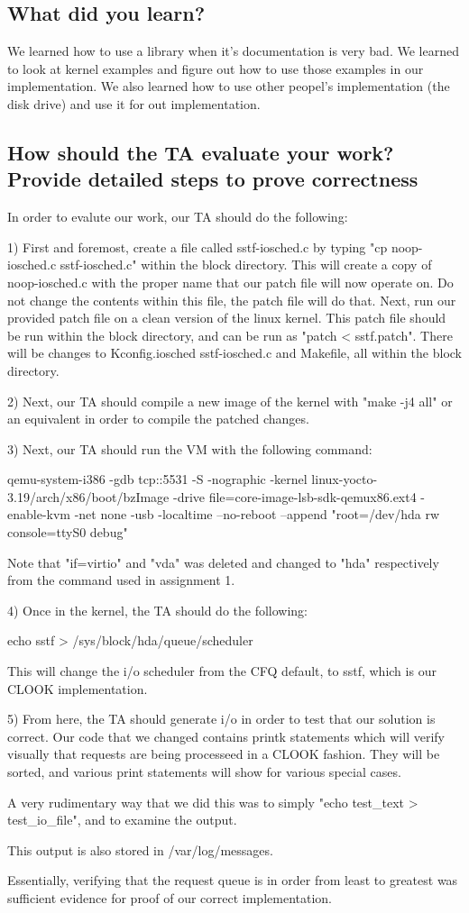 \documentclass{article}
\begin{document}
\subsection{What did you learn?}
We learned how to use a library when it's documentation is very bad. We learned to look at kernel examples and figure out how to use those examples in our implementation. We also learned how to use other peopel's implementation (the disk drive) and use it for out implementation. 

\subsection{How should the TA evaluate your work? Provide detailed steps to prove correctness}
In order to evalute our work, our TA should do the following:

1) First and foremost, create a file called sstf-iosched.c by typing "cp noop-iosched.c sstf-iosched.c" within the block directory. This will create a copy of noop-iosched.c with the proper name that our patch file will now operate on. Do not change the contents within this file, the patch file will do that. Next, run our provided patch file on a clean version of the linux kernel. This patch file should be run within the block directory, and can be run as "patch < sstf.patch". There will be changes to Kconfig.iosched sstf-iosched.c and Makefile, all within the block directory.

2) Next, our TA should compile a new image of the kernel with "make -j4 all" or an equivalent in order to compile the patched changes.

3) Next, our TA should run the VM with the following command:

qemu-system-i386 -gdb tcp::5531 -S -nographic -kernel linux-yocto-3.19/arch/x86/boot/bzImage -drive file=core-image-lsb-sdk-qemux86.ext4 -enable-kvm -net none -usb -localtime --no-reboot --append "root=/dev/hda rw console=ttyS0 debug"

Note that "if=virtio" and "vda" was deleted and changed to "hda" respectively from the command used in assignment 1.

4) Once in the kernel, the TA should do the following:

echo sstf > /sys/block/hda/queue/scheduler

This will change the i/o scheduler from the CFQ default, to sstf, which is our CLOOK implementation.

5) From here, the TA should generate i/o in order to test that our solution is correct. Our code that we changed contains printk statements which will verify visually that requests are being processeed in a CLOOK fashion. They will be sorted, and various print statements will show for various special cases.

A very rudimentary way that we did this was to simply "echo test\_text > test\_io\_file", and to examine the output.

This output is also stored in /var/log/messages.

Essentially, verifying that the request queue is in order from least to greatest was sufficient evidence for proof of our correct implementation.
\end{document}
